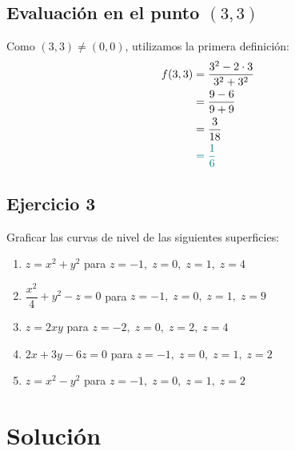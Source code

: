 \documentclass{article}
\begin{document}
\subsection*{Evaluación en el punto \((3,3)\)}

Como \((3,3)\neq(0,0)\), utilizamos la primera definición:
\begin{align*}
f(3,3) &= \frac{3^2 - 2\cdot3}{3^2 + 3^2} \\
       &= \frac{9 - 6}{9 + 9} \\
       &= \frac{3}{18} \\
       &\color{teal}=\frac{1}{6}
\end{align*}
\newpage
\subsection{Ejercicio 3}
Graficar las curvas de nivel de las siguientes superficies:

\begin{enumerate}
    \item \( z = x^2 + y^2 \) para \( z = -1,\; z = 0,\; z = 1,\; z = 4 \)
    
    \item \( \dfrac{x^2}{4} + y^2 - z = 0 \) para \( z = -1,\; z = 0,\; z = 1,\; z = 9 \)
    
    \item \( z = 2xy \) para \( z = -2,\; z = 0,\; z = 2,\; z = 4 \)
    
    \item \( 2x + 3y - 6z = 0 \) para \( z = -1,\; z = 0,\; z = 1,\; z = 2 \)
    
    \item \( z = x^2 - y^2 \) para \( z = -1,\; z = 0,\; z = 1,\; z = 2 \)
\end{enumerate}

\newpage
\section*{Solución}
\end{document}
